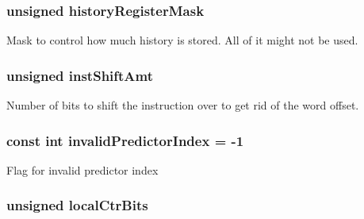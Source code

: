 \label{classTournamentBP_ab40a9a7c94a0d33e3b1782a60c208c56}
\hypertarget{classTournamentBP_acdbccf5f7c6840a7dd6cd9350d2d29c2}{
\subsubsection[{historyRegisterMask}]{\setlength{\rightskip}{0pt plus 5cm}unsigned {\bf historyRegisterMask}}}
\label{classTournamentBP_acdbccf5f7c6840a7dd6cd9350d2d29c2}
Mask to control how much history is stored. All of it might not be used. \hypertarget{classTournamentBP_a8ad2ee60a6143561753205840ad144e7}{
\subsubsection[{instShiftAmt}]{\setlength{\rightskip}{0pt plus 5cm}unsigned {\bf instShiftAmt}}}
\label{classTournamentBP_a8ad2ee60a6143561753205840ad144e7}
Number of bits to shift the instruction over to get rid of the word offset. \hypertarget{classTournamentBP_ac963a89cba9b2e4b21e99863bc5a78f1}{
\subsubsection[{invalidPredictorIndex}]{\setlength{\rightskip}{0pt plus 5cm}const int {\bf invalidPredictorIndex} = -\/1}}
\label{classTournamentBP_ac963a89cba9b2e4b21e99863bc5a78f1}
Flag for invalid predictor index \hypertarget{classTournamentBP_a815998927bcd79afe7f787b90f9954f5}{
\subsubsection[{localCtrBits}]{\setlength{\rightskip}{0pt plus 5cm}unsigned {\bf localCtrBits}}}
